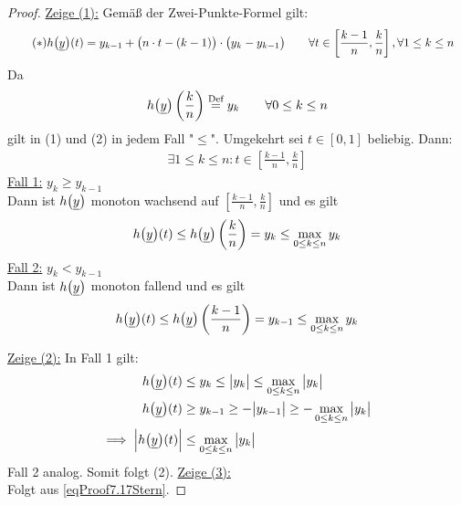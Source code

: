 \begin{proof}
	\underline{Zeige (1):}
	Gemäß der Zwei-Punkte-Formel gilt:
	\begin{align}\label{eqProof7.17Stern}\tag{$\ast$}
		h\big(\underline{y}\big)(t)
		&=y_{k-1}+\big(n\cdot t-(k-1)\big)\cdot\big(y_k-y_{k-1}\big)
		\qquad\forall t\in\left[\frac{k-1}{n},\frac{k}{n}\right],\forall 1\leq k\leq n
	\end{align}
	Da
	\begin{align*}
		h\big(\underline{y}\big)\left(\frac{k}{n}\right)\overset{\text{Def}}{=}y_k\qquad\forall 0\leq k\leq n
	\end{align*}
	gilt in (1) und (2) in jedem Fall "$\leq$". Umgekehrt sei $t\in[0,1]$ beliebig. Dann:
	\begin{align*}
		\exists 1\leq k\leq n:t\in\left[\frac{k-1}{n},\frac{k}{n}\right]
	\end{align*}
	\underline{Fall 1:} $y_k\geq y_{k-1}$\\
	Dann ist $h\big(\underline{y}\big)$ monoton wachsend auf $\left[\frac{k-1}{n},\frac{k}{n}\right]$ und es gilt
	\begin{align*}
		h\big(\underline{y}\big)(t)\leq h\big(\underline{y}\big)\left(\frac{k}{n}\right)=y_k\leq\max\limits_{0\leq k\leq n} y_k
	\end{align*}
	\underline{Fall 2:} $y_k<y_{k-1}$\\
	Dann ist $h\big(\underline{y}\big)$ monoton fallend und es gilt
	\begin{align*}
		h\big(\underline{y}\big)(t)\leq h\big(\underline{y}\big)\left(\frac{k-1}{n}\right)=y_{k-1}\leq\max\limits_{0\leq k\leq n}y_k
	\end{align*}

	\underline{Zeige (2):} In Fall 1 gilt:
	\begin{align*}
		h\big(\underline{y}\big)(t)&\leq y_k\leq\big|y_k\big|\leq\max\limits_{0\leq k\leq n}\big|y_k\big|\\
		h\big(\underline{y}\big)(t)&\geq y_{k-1}\geq-\big|y_{k-1}\big|\geq-\max\limits_{0\leq k\leq n}\big|y_k\big|\\
		\implies
		\Big|h\big(\underline{y}\big)(t)\Big|&\leq\max\limits_{0\leq k\leq n}\big| y_k\big|
	\end{align*}
	Fall 2 analog. Somit folgt (2).\nl
	\underline{Zeige (3):}\\
	Folgt aus \eqref{eqProof7.17Stern}.
\end{proof}

